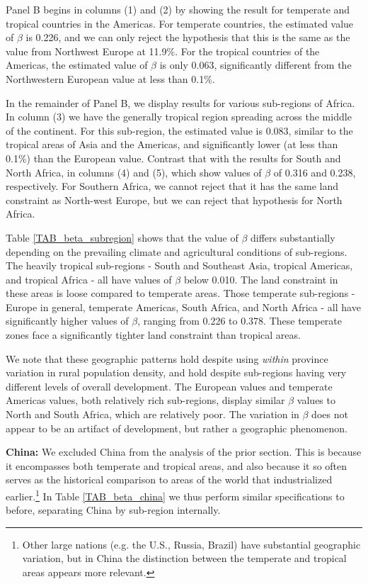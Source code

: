 \documentclass[11pt]{article}
\begin{document}
Panel B begins in columns (1) and (2) by showing the result for temperate and tropical countries in the Americas. For temperate countries, the estimated value of $\beta$ is 0.226, and we can only reject the hypothesis that this is the same as the value from Northwest Europe at 11.9\%. For the tropical countries of the Americas, the estimated value of $\beta$ is only 0.063, significantly different from the Northwestern European value at less than 0.1\%.

In the remainder of Panel B, we display results for various sub-regions of Africa. In column (3) we have the generally tropical region spreading across the middle of the continent. For this sub-region, the estimated value is 0.083, similar to the tropical areas of Asia and the Americas, and significantly lower (at less than 0.1\%) than the European value. Contrast that with the results for South and North Africa, in columns (4) and (5), which show values of $\beta$ of 0.316 and 0.238, respectively. For Southern Africa, we cannot reject that it has the same land constraint as North-west Europe, but we can reject that hypothesis for North Africa.

Table \ref{TAB_beta_subregion} shows that the value of $\beta$ differs substantially depending on the prevailing climate and agricultural conditions of sub-regions. The heavily tropical sub-regions - South and Southeast Asia, tropical Americas, and tropical Africa - all have values of $\beta$ below 0.010. The land constraint in these areas is loose compared to temperate areas. Those temperate sub-regions - Europe in general, temperate Americas, South Africa, and North Africa - all have significantly higher values of $\beta$, ranging from 0.226 to 0.378. These temperate zones face a significantly tighter land constraint than tropical areas.

We note that these geographic patterns hold despite using \textit{within} province variation in rural population density, and hold despite sub-regions having very different levels of overall development. The European values and temperate Americas values, both relatively rich sub-regions, display similar $\beta$ values to North and South Africa, which are relatively poor. The variation in $\beta$ does not appear to be an artifact of development, but rather a geographic phenomenon.

\vspace{.5cm}\noindent\textbf{China:} We excluded China from the analysis of the prior section. This is because it encompasses both temperate and tropical areas, and also because it so often serves as the historical comparison to areas of the world that industrialized earlier.\footnote{Other large nations (e.g. the U.S., Russia, Brazil) have substantial geographic variation, but in China the distinction between the temperate and tropical areas appears more relevant.} In Table \ref{TAB_beta_china} we thus perform similar specifications to before, separating China by sub-region internally. 
\end{document}
